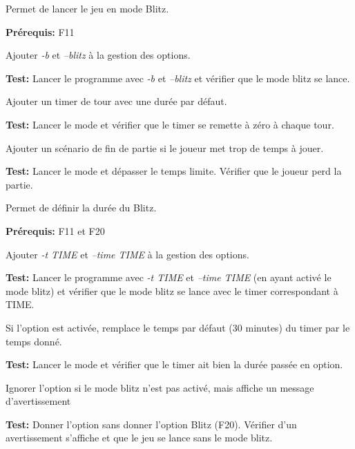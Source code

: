 \documentclass{article}
\begin{document}
\begin{needbox}
    Permet de lancer le jeu en mode Blitz.

    \textbf{Prérequis:} F11
    \begin{subneedbox}
        Ajouter \textit{-b} et \textit{--blitz} à la gestion des options.

        \textbf{Test:} Lancer le programme avec \textit{-b} et \textit{--blitz} et vérifier que le mode blitz se lance.
    \end{subneedbox}
    \begin{subneedbox}
        Ajouter un timer de tour avec une durée par défaut.

        \textbf{Test:} Lancer le mode et vérifier que le timer se remette à zéro à chaque tour.
    \end{subneedbox}
    \begin{subneedbox}
        Ajouter un scénario de fin de partie si le joueur met trop de temps à jouer.

        \textbf{Test:} Lancer le mode et dépasser le temps limite. Vérifier que le joueur perd la partie.
    \end{subneedbox}
\end{needbox}

\begin{needbox}
    Permet de définir la durée du Blitz.

    \textbf{Prérequis:} F11 et F20
    \begin{subneedbox}
        Ajouter \textit{-t TIME} et \textit{--time TIME} à la gestion des options.

        \textbf{Test:} Lancer le programme avec \textit{-t TIME} et \textit{--time TIME} (en ayant activé le mode blitz)
        et vérifier que le mode blitz se lance avec le timer correspondant à TIME.
    \end{subneedbox}
    \begin{subneedbox}
        Si l'option est activée, remplace le temps par défaut (30 minutes) du timer par le temps donné.

        \textbf{Test:} Lancer le mode et vérifier que le timer ait bien la durée passée en option.
    \end{subneedbox}
    \begin{subneedbox}
        Ignorer l'option si le mode blitz n'est pas activé, mais affiche un message d'avertissement

        \textbf{Test:} Donner l'option sans donner l'option Blitz (F20). Vérifier d'un avertissement s'affiche
        et que le jeu se lance sans le mode blitz.
    \end{subneedbox}
\end{needbox}
\end{document}
